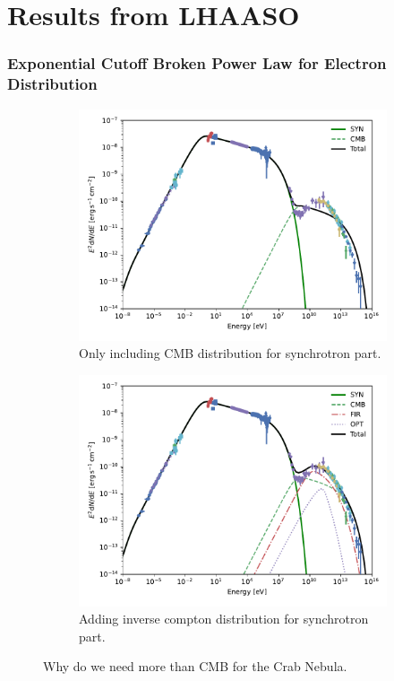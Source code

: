 \documentclass[9pt, mathserif]{beamer}
\begin{document}
    \section{Results from LHAASO}
        \begin{frame}
            \frametitle{Exponential Cutoff Broken Power Law for Electron Distribution}
            \begin{figure}[t]
                \centering
                \begin{subfigure}{0.48\linewidth}
                    \centering
                    \includegraphics[width=\linewidth]{SynIC-BestFitParCMB.pdf}
                    \caption{Only including CMB distribution for synchrotron part.}
                \end{subfigure}
                \begin{subfigure}{0.48\textwidth}
                    \centering
                    \includegraphics[width=\linewidth]{SynIC-BestFitPar1.pdf}
                    \caption{Adding inverse compton distribution for synchrotron part.}
                \end{subfigure}
                \caption{Why do we need more than CMB for the Crab Nebula.}
            \end{figure}
        \end{frame}
\end{document}
